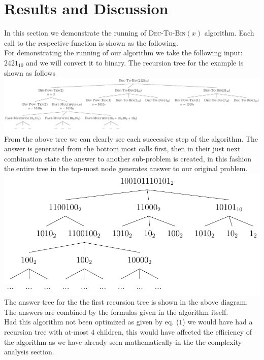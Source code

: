 \documentclass[12pt,a4paper]{article}%
\begin{document}
	\section{Results and Discussion}
	\begin{flushleft}
		In this section we demonstrate the running of \textsc{Dec-To-Bin}$(x)$ algorithm. Each call to the respective function is shown as the following.\\
		
		For demonstrating the running of  our algorithm we take the following input: $2421_{10}$ and we will convert it to binary. The recursion tree for the example is shown as follows\\\bigskip
		\hspace*{-0.7in}
		\includegraphics[scale=0.58]{./tree.pdf}
		From the above tree we can clearly see each successive step of the algorithm. The answer is generated from the bottom most calls first, then in their just next combination state the answer to another sub-problem is created, in this fashion the entire tree in the top-most node generates answer to our original problem. \\\bigskip
		\includegraphics[scale=1]{./answertree.pdf}\\\bigskip
		The answer tree for the the first recursion tree is shown in the above diagram. The answers are combined by the formulas given in the algorithm itself.\\\smallskip
		Had this algorithm not been optimized as given by eq. ($1$) we would have had a recursion tree with at-most $4$ children, this would have affected the efficiency of the algorithm as we have already seen mathematically in the the complexity analysis section.
	\end{flushleft}
\end{document}
